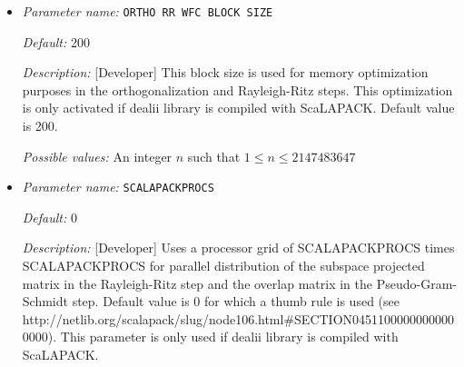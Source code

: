 \begin{itemize}


{\it Default:} PGS


{\it Description:} [Standard] Parameter specifying the type of orthogonalization to be used: GS(Gram-Schmidt Orthogonalization using SLEPc library), LW(Lowden Orthogonalization implemented using LAPACK library, extension to use ScaLAPACK library not implemented yet), PGS(Pseudo-Gram-Schmidt Orthogonalization: if dealii library is compiled with ScaLAPACK and if you are using the real executable, parallel ScaLAPACK functions are used, otherwise serial LAPACK functions are used.) PGS is the default option.


{\it Possible values:} Any one of GS, LW, PGS
\item {\it Parameter name:} {\tt ORTHO RR WFC BLOCK SIZE}
\label{parameters:SCF parameters/Eigen_2dsolver parameters/ORTHO RR WFC BLOCK SIZE}
\label{parameters:SCF_20parameters/Eigen_2dsolver_20parameters/ORTHO_20RR_20WFC_20BLOCK_20SIZE}




{\it Default:} 200


{\it Description:} [Developer] This block size is used for memory optimization purposes in the orthogonalization and Rayleigh-Ritz steps. This optimization is only activated if dealii library is compiled with ScaLAPACK. Default value is 200.


{\it Possible values:} An integer $n$ such that $1\leq n \leq 2147483647$
\item {\it Parameter name:} {\tt SCALAPACKPROCS}
\label{parameters:SCF parameters/Eigen_2dsolver parameters/SCALAPACKPROCS}
\label{parameters:SCF_20parameters/Eigen_2dsolver_20parameters/SCALAPACKPROCS}




{\it Default:} 0


{\it Description:} [Developer] Uses a processor grid of SCALAPACKPROCS times SCALAPACKPROCS for parallel distribution of the subspace projected matrix in the Rayleigh-Ritz step and the overlap matrix in the Pseudo-Gram-Schmidt step. Default value is 0 for which a thumb rule is used (see http://netlib.org/scalapack/slug/node106.html\#SECTION04511000000000000000). This parameter is only used if dealii library is compiled with ScaLAPACK.



\end{itemize}
